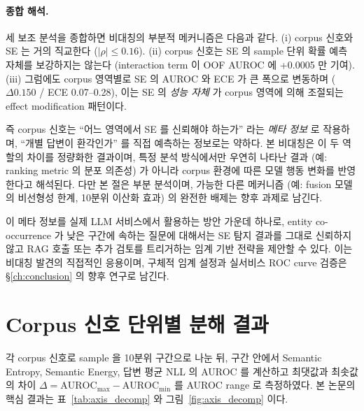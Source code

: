 \documentclass[oneside,ko,under]{snuthesis}
\begin{document}
\paragraph{종합 해석.}
세 보조 분석을 종합하면 비대칭의 부분적 메커니즘은 다음과 같다. (i) corpus 신호와 SE 는 거의 직교한다 ($|\rho| \leq 0.16$). (ii) corpus 신호는 SE 의 sample 단위 확률 예측 자체를 보강하지는 않는다 (interaction term 이 OOF AUROC 에 +0.0005 만 기여). (iii) 그럼에도 corpus 영역별로 SE 의 AUROC 와 ECE 가 큰 폭으로 변동하며 ($\Delta 0.150$ / ECE 0.07--0.28), 이는 SE 의 \emph{성능 자체} 가 corpus 영역에 의해 조절되는 effect modification 패턴이다.

즉 corpus 신호는 ``어느 영역에서 SE 를 신뢰해야 하는가'' 라는 \emph{메타 정보} 로 작용하며, ``개별 답변이 환각인가'' 를 직접 예측하는 정보로는 약하다. 본 비대칭은 이 두 역할의 차이를 정량화한 결과이며, 특정 분석 방식에서만 우연히 나타난 결과 (예: ranking metric 의 분포 의존성) 가 아니라 corpus 환경에 따른 모델 행동 변화를 반영한다고 해석된다. 다만 본 절은 부분 분석이며, 가능한 다른 메커니즘 (예: fusion 모델의 비선형성 한계, 10분위 이산화 효과) 의 완전한 배제는 향후 과제로 남긴다.

이 메타 정보를 실제 LLM 서비스에서 활용하는 방안 가운데 하나로, entity co-occurrence 가 낮은 구간에 속하는 질문에 대해서는 SE 탐지 결과를 그대로 신뢰하지 않고 RAG 호출 또는 추가 검토를 트리거하는 임계 기반 전략을 제안할 수 있다. 이는 비대칭 발견의 직접적인 응용이며, 구체적 임계 설정과 실서비스 ROC curve 검증은 §\ref{ch:conclusion} 의 향후 연구로 남긴다.


\section{Corpus 신호 단위별 분해 결과}\label{sec:axis}

각 corpus 신호로 sample 을 10분위 구간으로 나눈 뒤, 구간 안에서 Semantic Entropy, Semantic Energy, 답변 평균 NLL 의 AUROC 를 계산하고 최댓값과 최솟값의 차이 $\Delta = \mathrm{AUROC}_{\max} - \mathrm{AUROC}_{\min}$ 를 AUROC range 로 측정하였다. 본 논문의 핵심 결과는 표~\ref{tab:axis_decomp} 와 그림~\ref{fig:axis_decomp} 이다.
\end{document}

